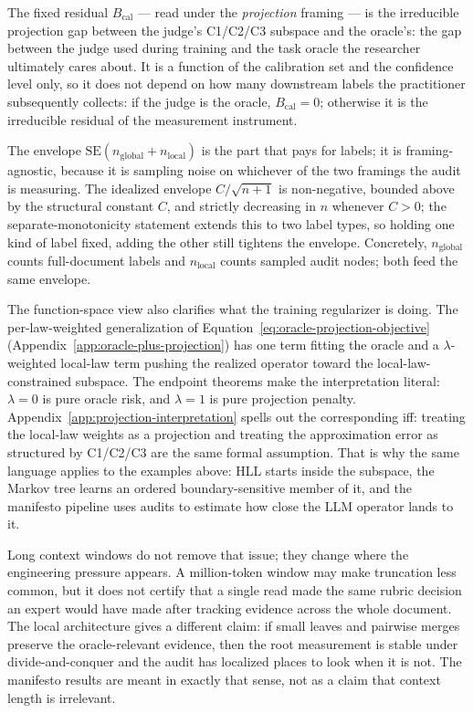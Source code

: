 The fixed residual $B_{\mathrm{cal}}$ --- read under the \emph{projection} framing --- is the irreducible projection gap between the judge's C1/C2/C3 subspace and the oracle's: the gap between the judge used during training and the task oracle the researcher ultimately cares about. It is a function of the calibration set and the confidence level only, so it does not depend on how many downstream labels the practitioner subsequently collects: if the judge is the oracle, $B_{\mathrm{cal}} = 0$; otherwise it is the irreducible residual of the measurement instrument.

The envelope $\text{SE}(n_{\mathrm{global}} + n_{\mathrm{local}})$ is the part that pays for labels; it is framing-agnostic, because it is sampling noise on whichever of the two framings the audit is measuring. The idealized envelope $C / \sqrt{n+1}$ is non-negative, bounded above by the structural constant $C$, and strictly decreasing in $n$ whenever $C > 0$; the separate-monotonicity statement extends this to two label types, so holding one kind of label fixed, adding the other still tightens the envelope. Concretely, $n_{\mathrm{global}}$ counts full-document labels and $n_{\mathrm{local}}$ counts sampled audit nodes; both feed the same envelope.

The function-space view also clarifies what the training regularizer is
doing. The per-law-weighted generalization of
Equation~\eqref{eq:oracle-projection-objective}
(Appendix~\ref{app:oracle-plus-projection}) has one term fitting the
oracle and a $\lambda$-weighted local-law term pushing the realized
operator toward the local-law-constrained subspace. The endpoint theorems make the
interpretation literal: $\lambda=0$ is pure oracle risk, and $\lambda=1$
is pure projection penalty. Appendix~\ref{app:projection-interpretation}
spells out the corresponding iff: treating the local-law weights as a
projection and treating the approximation error as structured by C1/C2/C3
are the same formal assumption. That is why the same language applies to
the examples above: HLL starts inside the subspace, the Markov tree learns
an ordered boundary-sensitive member of it, and the manifesto pipeline
uses audits to estimate how close the LLM operator lands to it.

Long context windows do not remove that issue; they change where the
engineering pressure appears. A million-token window may make truncation
less common, but it does not certify that a single read made the same
rubric decision an expert would have made after tracking evidence across
the whole document. The local architecture gives a different claim: if
small leaves and pairwise merges preserve the oracle-relevant evidence,
then the root measurement is stable under divide-and-conquer and the
audit has localized places to look when it is not. The manifesto results
are meant in exactly that sense, not as a claim that context length is
irrelevant.

